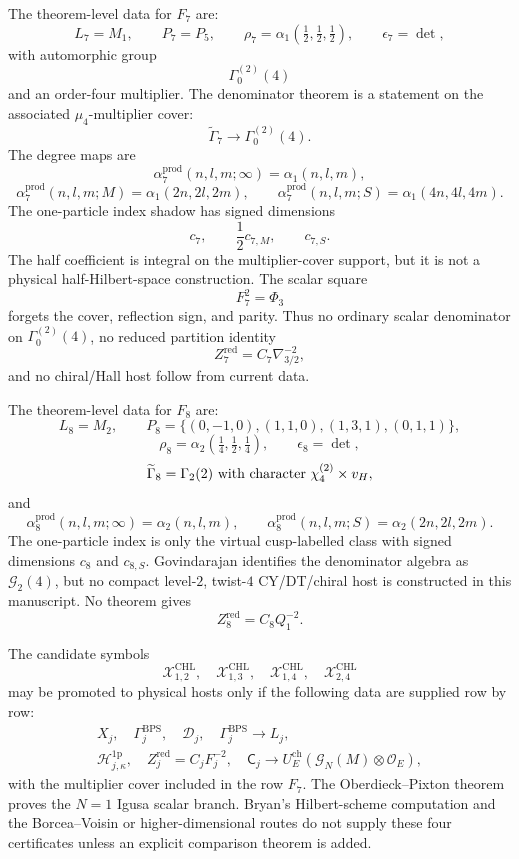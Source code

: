 \begin{proposition}[Row \(F_7=\nabla_{3/2}\)]
The theorem-level data for \(F_7\) are:
\[
L_7=M_1,\qquad P_7=P_5,\qquad
\rho_7=\alpha_1(\tfrac12,\tfrac12,\tfrac12),\qquad
\epsilon_7=\det,
\]
with automorphic group
\[
\Gamma_0^{(2)}(4)
\]
and an order-four multiplier.  The denominator theorem is a statement on
the associated \(\mu_4\)-multiplier cover:
\[
\widetilde{\Gamma}_7\longrightarrow\Gamma_0^{(2)}(4).
\]
The degree maps are
\[
\alpha_7^{\mathrm{prod}}(n,l,m;\infty)=\alpha_1(n,l,m),
\]
\[
\alpha_7^{\mathrm{prod}}(n,l,m;M)=\alpha_1(2n,2l,2m),\qquad
\alpha_7^{\mathrm{prod}}(n,l,m;S)=\alpha_1(4n,4l,4m).
\]
The one-particle index shadow has signed dimensions
\[
c_7,\qquad \frac12c_{7,M},\qquad c_{7,S}.
\]
The half coefficient is integral on the multiplier-cover support, but it
is not a physical half-Hilbert-space construction.  The scalar square
\[
F_7^2=\Phi_3
\]
forgets the cover, reflection sign, and parity.  Thus no ordinary scalar
denominator on \(\Gamma_0^{(2)}(4)\), no reduced partition identity
\[
Z_7^{\mathrm{red}}=C_7\nabla_{3/2}^{-2},
\]
and no chiral/Hall host follow from current data.
\end{proposition}

\begin{proposition}[Row \(F_8=Q_1\)]
The theorem-level data for \(F_8\) are:
\[
L_8=M_2,\qquad
P_8=\{(0,-1,0),(1,1,0),(1,3,1),(0,1,1)\},
\]
\[
\rho_8=\alpha_2(\tfrac14,\tfrac12,\tfrac14),\qquad
\epsilon_8=\det,
\]
\[
\widetilde{\Gamma}_8=\Gamma_2(2)\ \hbox{with character}\
\chi_4^{(2)}\times v_H,
\]
and
\[
\alpha_8^{\mathrm{prod}}(n,l,m;\infty)=\alpha_2(n,l,m),\qquad
\alpha_8^{\mathrm{prod}}(n,l,m;S)=\alpha_2(2n,2l,2m).
\]
The one-particle index is only the virtual cusp-labelled class with
signed dimensions \(c_8\) and \(c_{8,S}\).  Govindarajan identifies the
denominator algebra as \(\mathcal G_2(4)\), but no compact
level-\(2\), twist-\(4\) CY/DT/chiral host is constructed in this
manuscript.  No theorem gives
\[
Z_8^{\mathrm{red}}=C_8Q_1^{-2}.
\]
\end{proposition}

\begin{assumption}
The candidate symbols
\[
\mathcal X_{1,2}^{\mathrm{CHL}},\quad
\mathcal X_{1,3}^{\mathrm{CHL}},\quad
\mathcal X_{1,4}^{\mathrm{CHL}},\quad
\mathcal X_{2,4}^{\mathrm{CHL}}
\]
may be promoted to physical hosts only if the following data are supplied
row by row:
\[
\begin{gathered}
X_j,\quad \Gamma_j^{\mathrm{BPS}},\quad \mathscr D_j,\quad
\Gamma_j^{\mathrm{BPS}}\to L_j,\\
\mathcal H_{j,\kappa}^{1\mathrm p},\quad
Z_j^{\mathrm{red}}=C_jF_j^{-2},\quad
\mathsf C_j\to U_E^{\mathrm{ch}}(\mathcal G_N(M)\otimes\mathcal O_E),
\end{gathered}
\]
with the multiplier cover included in the row \(F_7\).  The
Oberdieck--Pixton theorem \cite{OB,OPand} proves the \(N=1\) Igusa
scalar branch.  Bryan's Hilbert-scheme computation \cite{BRYAN} and the
Borcea--Voisin or higher-dimensional routes \cite{BORCEA,VOISIN,CKOT,BOPY}
do not supply these four certificates unless an explicit comparison
theorem is added.
\end{assumption}

